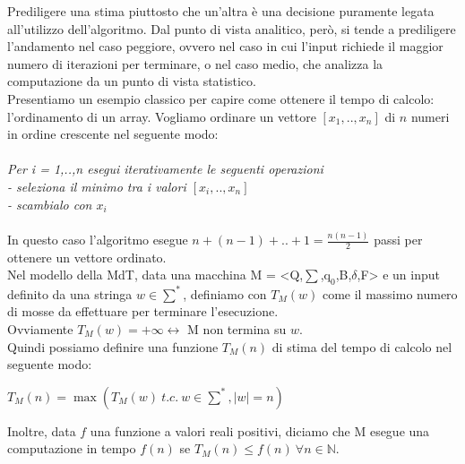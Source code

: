 Prediligere una stima piuttosto che un'altra è una decisione puramente legata all'utilizzo dell'algoritmo. Dal punto di vista analitico, però, si tende a prediligere l'andamento nel caso peggiore, ovvero nel caso in cui l'input richiede il maggior numero di iterazioni per terminare, o nel caso medio, che analizza la computazione da un punto di vista statistico.\\
Presentiamo un esempio classico per capire come ottenere il tempo di calcolo: l'ordinamento di un array. Vogliamo ordinare un vettore $[x_1,..,x_n]$ di $n$ numeri in ordine crescente nel seguente modo:\\
\\
\textit{Per i = 1,..,n esegui iterativamente le seguenti operazioni\\
    - seleziona il minimo tra i valori $[x_i,..,x_n]$\\
    - scambialo con $x_i$}\\
\\
In questo caso l'algoritmo esegue $n + (n-1) + .. + 1 = \frac{n(n-1)}{2}$ passi per ottenere un vettore ordinato.\\
Nel modello della MdT, data una macchina M = <Q,$\sum$,$\mathrm{q}_{0}$,B,$\delta$,F> e un input definito da una stringa $w \in \sum^*$, definiamo con $T_M(w)$ come il massimo numero di mosse da effettuare per terminare l'esecuzione.\\ Ovviamente $T_M(w) = +\infty \leftrightarrow$ M non termina su $ w $.\\
Quindi possiamo definire una funzione $T_M(n)$ di stima del tempo di calcolo nel seguente modo:
\begin{center}
{$T_M(n) = \max(T_M(w) \ t.c.\ w \in \sum^* , |w| = n)$}
\end{center}
Inoltre, data $ f $ una funzione a valori reali positivi, diciamo che M esegue una computazione in tempo $f(n)$ se $T_M(n) \leq f(n) \ \forall n \in \mathbb{N}$.
